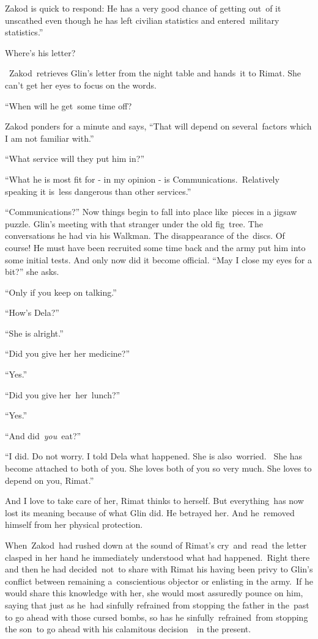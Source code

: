 \documentclass[letterpaper]{article}
\begin{document}
Zakod is quick to respond: {\textquotedbl}He has a very good chance of getting out\ of it unscathed even though he has
left civilian statistics and entered\ military statistics.''\ 

{\textquotedbl}Where{}'s his letter?{\textquotedbl} 

~Zakod~retrieves Glin{}'s letter from the night table and hands\ it to Rimat. She can{}'t get her eyes to focus on the
words. 

 ``When will he get~some time off?{\textquotedbl}

Zakod ponders for a minute and says, ``That will depend on several\ factors which I am not familiar with.'' 

{}``What service will they put him in?{}''

{}``What he is most fit for - in my opinion - is Communications.\ Relatively speaking it is~less dangerous than other
services.''\ 

{}``Communications?'' Now things begin to fall into place like\ pieces in a jigsaw puzzle. Glin's meeting with that
stranger under the old fig\ tree. The conversations he had via his Walkman. The disappearance of the\ discs. Of course!
He must have been recruited some time back and the army put him into some initial tests. And only now did it become
official. ``May I close my eyes for a bit?'' she asks.\ 

{}``Only if you keep on talking.''\ 

{}``How{}'s Dela?''\ 

{}``She is alright.''\ 

{}``Did you give her her medicine?''\ 

{}``Yes.''\ 

{}``Did you give her\textcolor{red}{\ }her\ lunch?''\ 

{}``Yes.''\ 

{}``And did\ \textit{you}\ eat?''\ 

{}``I did. Do not worry. I told Dela what happened. She is also\ worried.~ She has become attached to both of you. She
loves both of you so very much. She loves to depend on you, Rimat.{}''

And I love to take care of her, Rimat thinks to herself. But everything\ has now lost its meaning because of what Glin
did. He betrayed her. And he\ removed himself from her physical protection.

When\textcolor{red}{\ }Zakod\ had rushed down at the sound of Rimat{}'s cry\ and\ read\ the letter clasped in her hand
he immediately understood what had happened.\ Right there and then he had decided\textcolor{red}{\ }not\ to share with
Rimat his having been privy to Glin{}'s conflict between remaining a~conscientious objector or enlisting in the
army.\ If he would share this knowledge with her, she would most assuredly pounce on him, saying that just as he\ had
sinfully refrained from stopping the father in the\ past to go ahead with those cursed bombs, so has he
sinfully\ refrained\ from stopping the son\ to go ahead with his calamitous decision\ \ in the present. 
\end{document}
